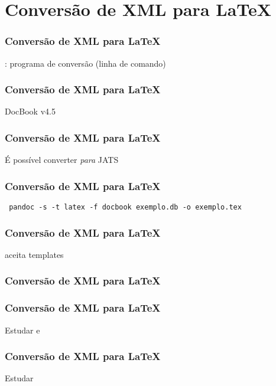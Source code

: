 \section{Conversão de XML para \LaTeX}

\begin{frame}
  \frametitle{Conversão de XML para \LaTeX}
  \LARGE
  : programa de conversão (linha de comando)
\end{frame}

\begin{frame}
  \frametitle{Conversão de XML para \LaTeX}
  \LARGE
  DocBook v4.5
\end{frame}

\begin{frame}
  \frametitle{Conversão de XML para \LaTeX}
  \LARGE
  É possível converter \emph{para} JATS
\end{frame}

\begin{frame}
  \frametitle{Conversão de XML para \LaTeX}
  \LARGE
  \texttt{
    pandoc -s -t latex -f docbook exemplo.db -o exemplo.tex
  }
\end{frame}

\begin{frame}
  \frametitle{Conversão de XML para \LaTeX}
  \LARGE
   aceita templates
\end{frame}

\begin{frame}
  \frametitle{Conversão de XML para \LaTeX}
  \LARGE
\end{frame}

\begin{frame}
  \frametitle{Conversão de XML para \LaTeX}
  \huge
  Estudar  e
\end{frame}

\begin{frame}
  \frametitle{Conversão de XML para \LaTeX}
  \huge
  Estudar 
\end{frame}
